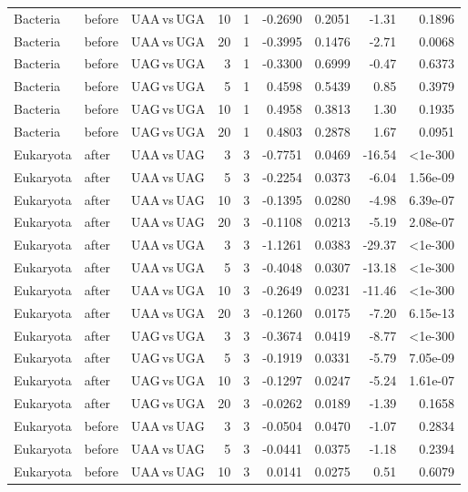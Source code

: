 \begin{longtable}{lllrlrrrr}
Bacteria & before & UAA$\,$vs$\,$UGA & 10 & 1 & -0.2690 & 0.2051 & -1.31 & 0.1896 \\
Bacteria & before & UAA$\,$vs$\,$UGA & 20 & 1 & -0.3995 & 0.1476 & -2.71 & 0.0068 \\
Bacteria & before & UAG$\,$vs$\,$UGA & 3 & 1 & -0.3300 & 0.6999 & -0.47 & 0.6373 \\
Bacteria & before & UAG$\,$vs$\,$UGA & 5 & 1 & 0.4598 & 0.5439 & 0.85 & 0.3979 \\
Bacteria & before & UAG$\,$vs$\,$UGA & 10 & 1 & 0.4958 & 0.3813 & 1.30 & 0.1935 \\
Bacteria & before & UAG$\,$vs$\,$UGA & 20 & 1 & 0.4803 & 0.2878 & 1.67 & 0.0951 \\
Eukaryota & after & UAA$\,$vs$\,$UAG & 3 & 3 & -0.7751 & 0.0469 & -16.54 & <1e-300 \\
Eukaryota & after & UAA$\,$vs$\,$UAG & 5 & 3 & -0.2254 & 0.0373 & -6.04 & 1.56e-09 \\
Eukaryota & after & UAA$\,$vs$\,$UAG & 10 & 3 & -0.1395 & 0.0280 & -4.98 & 6.39e-07 \\
Eukaryota & after & UAA$\,$vs$\,$UAG & 20 & 3 & -0.1108 & 0.0213 & -5.19 & 2.08e-07 \\
Eukaryota & after & UAA$\,$vs$\,$UGA & 3 & 3 & -1.1261 & 0.0383 & -29.37 & <1e-300 \\
Eukaryota & after & UAA$\,$vs$\,$UGA & 5 & 3 & -0.4048 & 0.0307 & -13.18 & <1e-300 \\
Eukaryota & after & UAA$\,$vs$\,$UGA & 10 & 3 & -0.2649 & 0.0231 & -11.46 & <1e-300 \\
Eukaryota & after & UAA$\,$vs$\,$UGA & 20 & 3 & -0.1260 & 0.0175 & -7.20 & 6.15e-13 \\
Eukaryota & after & UAG$\,$vs$\,$UGA & 3 & 3 & -0.3674 & 0.0419 & -8.77 & <1e-300 \\
Eukaryota & after & UAG$\,$vs$\,$UGA & 5 & 3 & -0.1919 & 0.0331 & -5.79 & 7.05e-09 \\
Eukaryota & after & UAG$\,$vs$\,$UGA & 10 & 3 & -0.1297 & 0.0247 & -5.24 & 1.61e-07 \\
Eukaryota & after & UAG$\,$vs$\,$UGA & 20 & 3 & -0.0262 & 0.0189 & -1.39 & 0.1658 \\
Eukaryota & before & UAA$\,$vs$\,$UAG & 3 & 3 & -0.0504 & 0.0470 & -1.07 & 0.2834 \\
Eukaryota & before & UAA$\,$vs$\,$UAG & 5 & 3 & -0.0441 & 0.0375 & -1.18 & 0.2394 \\
Eukaryota & before & UAA$\,$vs$\,$UAG & 10 & 3 & 0.0141 & 0.0275 & 0.51 & 0.6079 \\

\end{longtable}

